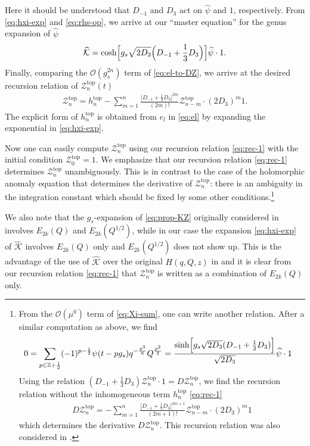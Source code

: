 \documentclass[11pt]{article}
\newcommand{\hf}{\frac{1}{2}}
\def\h#1{\widehat{#1}}
\def\rt#1{\sqrt{#1}}
\newcommand{\Ztop}{\mathcal{Z}^{\text{top}}}
\renewcommand{\[}{\begin{eqnarray}}
\renewcommand{\]}{\end{eqnarray}}
\newcommand{\htop}{h^{\text{top}}}
\begin{document}
Here it should be understood that $D_{-1}$ and $D_{3}$ act on $\h{\psi}$ and $1$, respectively.
From \eqref{eq:hxi-exp} and \eqref{eq:rhs-op}, we arrive at
our ``master equation'' for the genus expansion of $\h{\psi}$
\begin{align}
\h{\mathcal{K}}=
\cosh\Bigl[g_s\rt{2D_{3}}\Bigl(D_{-1}+\frac{1}{3}D_{3}\Bigr)\Bigr]\h{\psi}\cdot 1.
\label{eq:el-to-DZ}
\end{align}
Finally, comparing the $\mathcal{O}(g_s^{2n})$ term of \eqref{eq:el-to-DZ}, we arrive at the
desired recursion relation
of $\Ztop_n(t)$
\begin{align}
 \Ztop_n=\htop_n-\sum_{m=1}^n\frac{\bigl[D_{-1}+\frac{1}{3}D_{3}\bigr]^{2m}}{(2m)!}\Ztop_{n-m}\cdot (2D_{3})^{m}1.
\label{eq:rec-1}
\end{align}
The explicit form of $\htop_n$ is obtained from $e_l$ in \eqref{eq:el}
by expanding the exponential in \eqref{eq:hxi-exp}.

Now one can easily compute $\Ztop_n$ using our recursion relation \eqref{eq:rec-1}
with the initial condition 
$\Ztop_0=1$.
We emphasize that our recursion relation \eqref{eq:rec-1}
determines $\Ztop_n$  unambiguously. This is in contrast to
the case of the holomorphic anomaly equation that determines the derivative of 
$\Ztop_n$: there is an ambiguity in the integration constant
which should be fixed by some other conditions.\footnote{
From the $\mathcal{O}(\mu^0)$ term of \eqref{eq:Xi-sum}, one can write another relation.
After a similar computation as above, we find
\begin{align}
\begin{aligned}
0&=\sum_{p\in\mathbb{Z}+\hf}(-1)^{p-\hf}
\psi(t-pg_s)q^{-\frac{p^3}{6}}Q^{\frac{p^2}{2}}= 
\frac{\sinh\Bigl[g_s\rt{2D_{3}}(D_{-1}+\frac{1}{3}D_{3})\Bigr]}{\rt{2D_{3}}}
\h{\psi}\cdot 1
\end{aligned}
\label{eq:p-sum}
\end{align}
Using the relation $(D_{-1}+\frac{1}{3}D_{3})\Ztop_n\cdot1=D\Ztop_n$,
we find the recursion relation without the inhomogeneous term $\htop_n$
\eqref{eq:rec-1}
\begin{align}
 D\Ztop_n=-\sum_{m=1}^n \frac{\bigl[D_{-1}+\frac{1}{3}D_{3}\bigr]^{2m+1}}{(2m+1)!}\Ztop_{n-m}\cdot (2D_{3})^m1
\label{eq:rec-2}
\end{align}
which determines the derivative $D\Ztop_n$.
This recursion 
relation was also considered in \cite{Zagier-BO}.
}


We also note that the $g_s$-expansion of \eqref{eq:prop-KZ} originally considered in \cite{zagier}
involves $E_{2k}(Q)$ and $E_{2k}(Q^{1/2})$, while in our case
the expansion \eqref{eq:hxi-exp}
of $\h{\mathcal{K}}$ involves $E_{2k}(Q)$ only and $E_{2k}(Q^{1/2})$ does not show up. 
This is the advantage of the use of $\h{\mathcal{K}}$ 
over the original $H(q,Q,z)$ in \cite{zagier}
and it is clear from our recursion relation \eqref{eq:rec-1}
that $\Ztop_n$ is written as a combination of $E_{2k}(Q)$ only.
\end{document}
